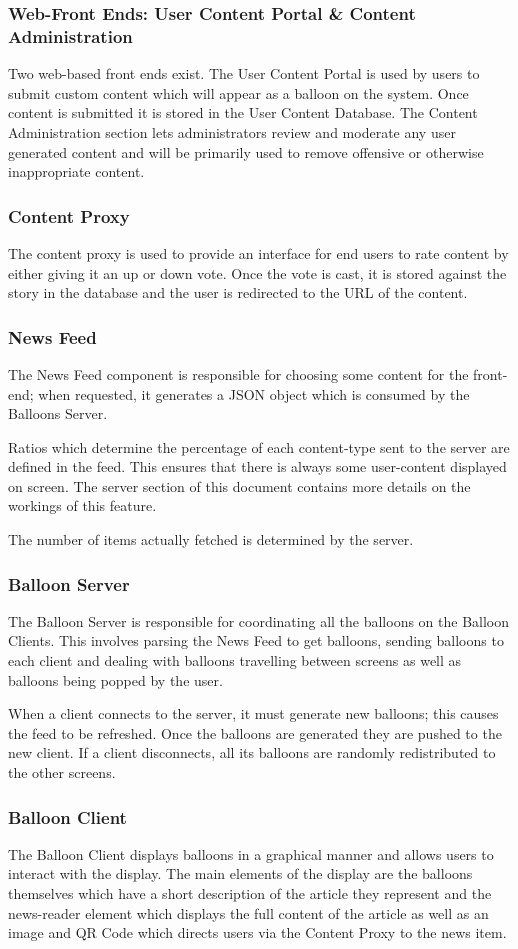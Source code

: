 \subsubsection{Web-Front Ends: User Content Portal \& Content Administration}
Two web-based front ends exist. The User Content Portal is used by users to 
submit custom content which will appear as a balloon on the system. Once 
content is submitted it is stored in the User Content Database. The Content
Administration section lets administrators review and moderate any user 
generated content and will be primarily used to remove offensive or otherwise
inappropriate content.

\subsubsection{Content Proxy}
The content proxy is used to provide an interface for end users to rate content
by either giving it an up or down vote. Once the vote is cast, it is stored
against the story in the database and the user is redirected to the URL of the
content.

\subsubsection{News Feed}
The News Feed component is responsible for choosing some content for the
front-end; when requested, it generates a JSON object which is consumed
by the Balloons Server.

Ratios which determine the percentage of each content-type sent to the server
are defined in the feed. This ensures that there is always some user-content
displayed on screen. The server section of this document contains more details
on the workings of this feature.

The number of items actually fetched is determined by the server.


\subsubsection{Balloon Server}
The Balloon Server is responsible for coordinating all the balloons on the 
Balloon Clients. This involves parsing the News Feed to get balloons, sending
balloons to each client and dealing with balloons travelling between screens 
as well as balloons being popped by the user. 

When a client connects to the server, it must generate new balloons; this 
causes the feed to be refreshed. Once the balloons are generated they are 
pushed to the new client. If a client disconnects, all its balloons are 
randomly redistributed to the other screens.

\subsubsection{Balloon Client}
The Balloon Client displays balloons in a graphical manner and allows users to
interact with the display. The main elements of the display are the balloons 
themselves which have a short description of the article they represent and the
news-reader element which displays the full content of the article as well as
an image and QR Code which directs users via the Content Proxy to the news item.
